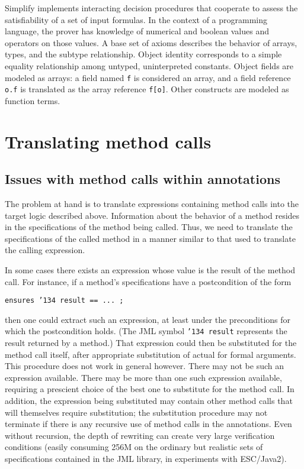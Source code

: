 \documentclass{sig-alternate}
\begin{document}
Simplify implements interacting decision procedures
 that cooperate to assess the satisfiability of a 
set of input formulas.
In the context of a programming language, the prover has knowledge of numerical and
boolean values and operators on those values.  A base set of axioms describes the behavior 
of arrays, types, and the subtype relationship.  Object identity corresponds to a simple
equality relationship among untyped, uninterpreted constants.  Object fields are modeled as
arrays: a field named \texttt{f} is considered an array, and a field reference \texttt{o.f} is
translated as the array reference \texttt{f[o]}.  Other constructs are modeled as function terms.

\section{Translating method calls}

\subsection{Issues with method calls within annotations}

The problem at hand is to translate expressions containing method calls into the target logic described above.   Information about the behavior of a method resides in
the specifications of the method being called.  Thus, we need to translate the specifications
of the called method
in a manner similar to that used to translate the calling expression.

In some cases there exists an expression whose value is the result of the method call.  For
instance, if a method's specifications have a postcondition of the form
\begin{center}\texttt{ensures \char'134 result == ... ; }\end{center}
then one could extract such an expression, at least under the preconditions for which the
postcondition holds.  (The JML symbol \texttt{\char'134 result} represents the result returned by a method.)  
That expression could then be substituted for the method call itself,
after appropriate substitution of actual for formal arguments.  This procedure does not work
in general however.  There may not be such an expression available.  There may be more than
one such
expression available, requiring a prescient choice of the best one to substitute for the method call.
In addition, the expression being substituted may contain other method calls that
will themselves require substitution; the substitution procedure may not terminate if there is
any recursive use of method calls in the annotations.  Even without recursion, the depth of
rewriting can create very large verification conditions (easily consuming 256M on the ordinary
but realistic sets of specifications contained in the JML library, in experiments with ESC/Java2).
\end{document}
